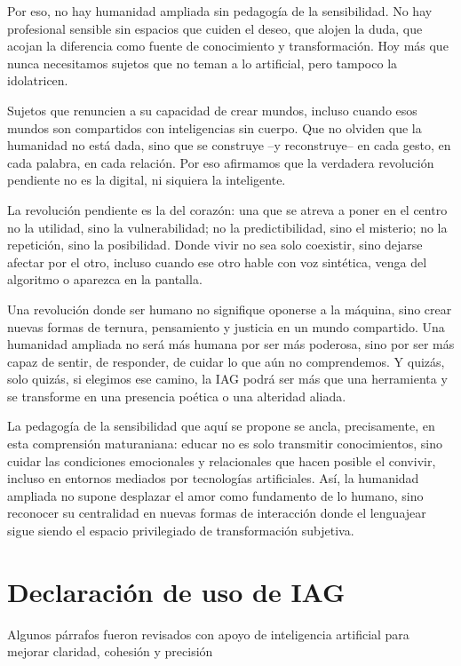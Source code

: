 \documentclass[spanish]{textolivre}
\begin{document}
Por eso, no hay humanidad ampliada sin pedagogía de la sensibilidad. No hay profesional sensible sin espacios que cuiden el deseo, que alojen la duda, que acojan la diferencia como fuente de conocimiento y transformación. Hoy más que nunca necesitamos sujetos que no teman a lo artificial, pero tampoco la idolatricen. 

Sujetos que renuncien a su capacidad de crear mundos, incluso cuando esos mundos son compartidos con inteligencias sin cuerpo. Que no olviden que la humanidad no está dada, sino que se construye –y reconstruye– en cada gesto, en cada palabra, en cada relación. Por eso afirmamos que la verdadera revolución pendiente no es la digital, ni siquiera la inteligente. 

La revolución pendiente es la del corazón: una que se atreva a poner en el centro no la utilidad, sino la vulnerabilidad; no la predictibilidad, sino el misterio; no la repetición, sino la posibilidad. Donde vivir no sea solo coexistir, sino dejarse afectar por el otro, incluso cuando ese otro hable con voz sintética, venga del algoritmo o aparezca en la pantalla.

Una revolución donde ser humano no signifique oponerse a la máquina, sino crear nuevas formas de ternura, pensamiento y justicia en un mundo compartido. Una humanidad ampliada no será más humana por ser más poderosa, sino por ser más capaz de sentir, de responder, de cuidar lo que aún no comprendemos. Y quizás, solo quizás, si elegimos ese camino, la IAG podrá ser más que una herramienta y se transforme en una presencia poética o una alteridad aliada. 

La pedagogía de la sensibilidad que aquí se propone se ancla, precisamente, en esta comprensión maturaniana: educar no es solo transmitir conocimientos, sino cuidar las condiciones emocionales y relacionales que hacen posible el convivir, incluso en entornos mediados por tecnologías artificiales. Así, la humanidad ampliada no supone desplazar el amor como fundamento de lo humano, sino reconocer su centralidad en nuevas formas de interacción donde el lenguajear sigue siendo el espacio privilegiado de transformación subjetiva.


\printbibliography\label{sec-bib}

\section*{\fontsize{10}{12}\selectfont Declaración de uso de IAG}
Algunos párrafos fueron revisados con apoyo de inteligencia artificial para mejorar claridad, cohesión y precisión

\begin{dataavailability}
\end{dataavailability}
\end{document}

